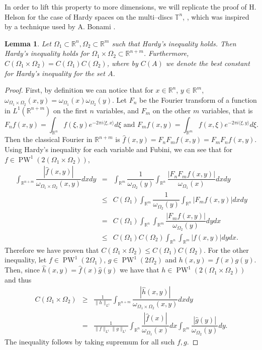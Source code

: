 \documentclass[footinclude=true]{amsart}
\theoremstyle{plain}
\newtheorem{lm}[theo]{Lemma}
\DeclareMathOperator{\PW}{PW}
\begin{document}
	In order to lift this property to more dimensions, we will replicate the proof of H. Helson for the case of Hardy spaces on the multi--discs $\mathbb{T}^{n}$, \cite{MR2263964}, which was inspired by a technique used by A. Bonami \cite{MR283496}.
	\begin{lm}\label{prod}
		Let $\Omega_{1}\subset\mathbb{R}^{n},\Omega_{2}\subset\mathbb{R}^{m}$ such that Hardy's inequality holds. Then Hardy's inequality holds for $\Omega_{1}\times\Omega_{2}\subset \mathbb{R}^{n+m}$. Furthermore, $C(\Omega_1\times \Omega_2)=C(\Omega_1)C(\Omega_2)$, where by $C(A)$ we denote the best constant for Hardy's inequality for the set $A$.
	\end{lm}
	\begin{proof}
		First, by definition we can notice that for $x\in \mathbb{R}^{n}$, $y\in\mathbb{R}^{m}$, $\omega_{\Omega_{1}\times\Omega_{2}}(x,y)=\omega_{\Omega_{1}}(x)\omega_{\Omega_{2}}(y)$. Let $F_n$ be the Fourier transform of a function in $L^{1}(\mathbb{R}^{n+m})$ on the first $n$ variables, and $F_m$ on the other $m$ variables, that is 
		$$F_n f(x,y)=\int_{\mathbb{R}^n}f(\xi,y)e^{-2\pi i \langle \xi,x\rangle}d\xi\text{   and   } F_m f(x,y)=\int_{\mathbb{R}^m}f(x,\xi)e^{-2\pi i \langle \xi,y\rangle}d\xi.$$
		Then the classical Fourier in $\mathbb{R}^{n+m}$ is $\widehat{f}(x,y)=F_n F_m f(x,y)=F_m F_n f(x,y)$. Using Hardy's inequality for each variable and Fubini, we can see that for $f\in\PW^{1}(2(\Omega_{1}\times\Omega_{2}))$,
		\begin{eqnarray}
			\int_{\mathbb{R}^{n+m}}\dfrac{|\widehat{f}(x,y)|}{\omega_{\Omega_1\times\Omega_2}(x,y)}dxdy&=& \int_{\mathbb{R}^{m}}\dfrac{1}{\omega_{\Omega_2}(y)}\int_{\mathbb{R}^{n}}\dfrac{|F_nF_mf(x,y)|}{\omega_{\Omega_1}(x)}dxdy \nonumber \\ &\leq&  C(\Omega_1)\int_{\mathbb{R}^{m}}\dfrac{1}{\omega_{\Omega_2}(y)}\int_{\mathbb{R}^{n}}|F_mf(x,y)|dx dy\nonumber  \\
			&=& C(\Omega_1) \int_{\mathbb{R}^{n}}\int_{\mathbb{R}^{m}}\dfrac{|F_mf(x,y)|}{\omega_{\Omega_2}(y)}dy dx  \nonumber \\
			&\leq& C(\Omega_1)C(\Omega_2) \int_{\mathbb{R}^{n}}\int_{\mathbb{R}^{m}}| f(x,y)|dy dx . \nonumber 
		\end{eqnarray}
		Therefore we have proven that $C(\Omega_1\times\Omega_2)\leq C(\Omega_1)C(\Omega_2)$. For the other inequality, let $f\in \PW^1(2\Omega_1)$, $g\in \PW^1(2\Omega_2)$ and $h(x,y)=f(x)g(y)$. Then, since $\widehat{h}(x,y)=\widehat{f}(x)\widehat{g}(y)$ we have that $h\in \PW^1(2(\Omega_1\times\Omega_2))$ and thus 
		\begin{eqnarray}
			C(\Omega_1\times\Omega_2)&\geq& \frac{1}{\|h\|_{L^1}}	\int_{\mathbb{R}^{n+m}}\dfrac{|\widehat{h}(x,y)|}{\omega_{\Omega_1\times\Omega_2}(x,y)}dxdy \nonumber \\
			&=& \frac{1}{\|f\|_{L^1}\|g\|_{L^1}}	\int_{\mathbb{R}^{n}}\dfrac{|\widehat{f}(x)|}{\omega_{\Omega_1}(x)}dx \int_{\mathbb{R}^{m}}\dfrac{|\widehat{g}(y)|}{\omega_{\Omega_2}(y)}dy. \nonumber 
		\end{eqnarray}
		The inequality follows by taking supremum for all such $f,g$.
	\end{proof}
\end{document}
